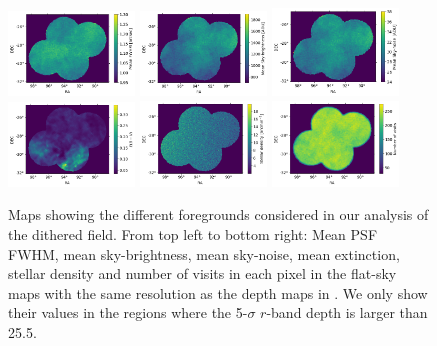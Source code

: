 \documentclass[a4paper,fleqn,usenatbib]{mnras}
\begin{document}
\begin{figure}
\centering
\includegraphics[width=0.30\textwidth]{mean_fwhm.png}
\includegraphics[width=0.30\textwidth]{mean_sky.png}
\includegraphics[width=0.30\textwidth]{mean_skynoise.png}
\includegraphics[width=0.30\textwidth]{extinction.png}
\includegraphics[width=0.30\textwidth]{stellar_density.png}
\includegraphics[width=0.30\textwidth]{nvisits.png}
\caption{Maps showing the different foregrounds considered in our analysis of the dithered field. From top left to bottom right: Mean PSF FWHM, mean sky-brightness, mean sky-noise, mean extinction, stellar density and number of visits in each pixel in the flat-sky maps with the same resolution as the depth maps in . We only show their values in the regions where the 5-$\sigma$ $r$-band depth is larger than 25.5.}
\label{fig:systematic_maps}
\end{figure}
\end{document}
